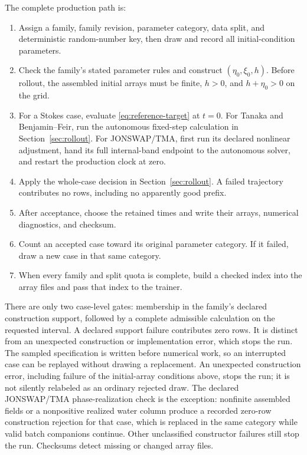 \documentclass[10pt]{article}
\begin{document}
The complete production path is:
\begin{enumerate}
  \item Assign a family, family revision, parameter category, data split, and
        deterministic random-number key, then draw and record all
        initial-condition parameters.
  \item Check the family's stated parameter rules and construct
        $(\eta_0,\xi_0,h)$.  Before rollout, the assembled initial arrays
        must be finite, \(h>0\), and \(h+\eta_0>0\) on the grid.
  \item For a Stokes case, evaluate \eqref{eq:reference-target} at $t=0$.
        For Tanaka and Benjamin--Feir, run the autonomous fixed-step
        calculation in Section~\ref{sec:rollout}.  For JONSWAP/TMA, first run
        its declared nonlinear adjustment, hand its full internal-band
        endpoint to the autonomous solver, and restart the production clock
        at zero.
  \item Apply the whole-case decision in Section~\ref{sec:rollout}.  A failed
        trajectory contributes no rows, including no apparently good prefix.
  \item After acceptance, choose the retained times and write their arrays,
        numerical diagnostics, and checksum.
  \item Count an accepted case toward its original parameter category.  If it
        failed, draw a new case in that same category.
  \item When every family and split quota is complete, build a checked index
        into the array files and pass that index to the trainer.
\end{enumerate}
There are only two case-level gates: membership in the family's declared
construction support, followed by a complete admissible calculation on the
requested interval.  A declared support failure contributes zero rows.  It
is distinct from an unexpected construction or implementation error, which
stops the run.
The sampled specification is written before numerical work, so an
interrupted case can be replayed without drawing a replacement.  An
unexpected construction error, including failure of the initial-array
conditions above, stops the run; it is not silently relabeled as an ordinary
rejected draw.  The declared JONSWAP/TMA phase-realization check is the
exception: nonfinite assembled fields or a nonpositive realized water column
produce a recorded zero-row construction rejection for that case, which is
replaced in the same category while valid batch companions continue.  Other
unclassified constructor failures still stop the run.  Checksums detect
missing or changed array files.
\end{document}
